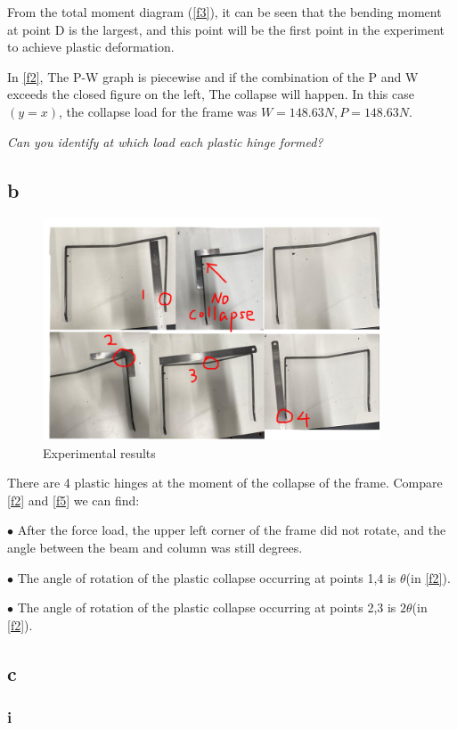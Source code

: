From the total moment diagram (\autoref{f3}), it can be seen that the bending moment at point D is the largest, and this point will be the first point in the experiment to achieve plastic deformation.

In \autoref{f2}, The P-W graph is piecewise and if the combination of the P and W exceeds the closed figure on the left, The collapse will happen. In this case$(y=x)$, the collapse load for the frame was $W=148.63N,P=148.63N$.

\textit{Can you identify at which load each plastic hinge formed?}


\subsection*{b}

\begin{figure}[htbp]
    \centering
    \includegraphics[width=10cm]{./fig/18.jpg}
    \caption{Experimental results}
    \label{f5}
\end{figure}

There are 4 plastic hinges at the moment of the collapse of the frame. Compare \autoref{f2} and \autoref{f5} we can find: 

$\bullet$ After the force load, the upper left corner of the frame did not rotate, and the angle between the beam and column was still degrees.

$\bullet$ The angle of rotation of the plastic collapse occurring at points 1,4 is $\theta$(in \autoref{f2}).

$\bullet$ The angle of rotation of the plastic collapse occurring at points 2,3 is $2\theta$(in \autoref{f2}).

\subsection*{c}
\subsubsection*{i}

